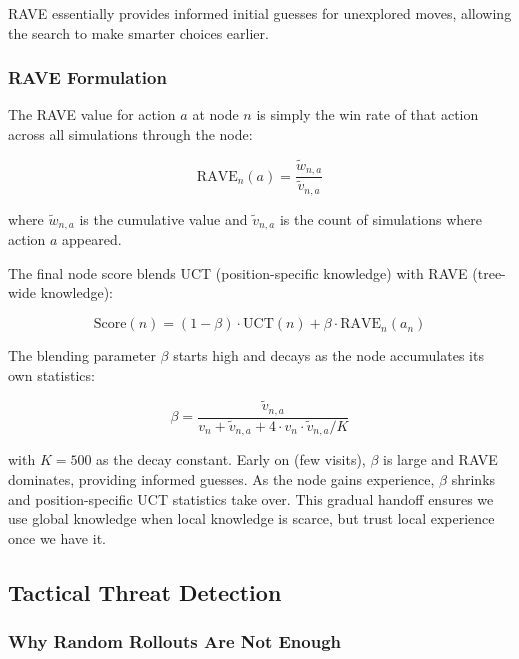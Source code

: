 \documentclass[11pt]{article}
\begin{document}
RAVE essentially provides informed initial guesses for unexplored moves, allowing the search to make smarter choices earlier.

\subsubsection{RAVE Formulation}

The RAVE value for action $a$ at node $n$ is simply the win rate of that action across all simulations through the node:

\begin{equation}
    \text{RAVE}_n(a) = \frac{\tilde{w}_{n,a}}{\tilde{v}_{n,a}}
\end{equation}

where $\tilde{w}_{n,a}$ is the cumulative value and $\tilde{v}_{n,a}$ is the count of simulations where action $a$ appeared.

The final node score blends UCT (position-specific knowledge) with RAVE (tree-wide knowledge):

\begin{equation}
    \text{Score}(n) = (1 - \beta) \cdot \text{UCT}(n) + \beta \cdot \text{RAVE}_n(a_n)
\end{equation}

The blending parameter $\beta$ starts high and decays as the node accumulates its own statistics:

\begin{equation}
    \beta = \frac{\tilde{v}_{n,a}}{v_n + \tilde{v}_{n,a} + 4 \cdot v_n \cdot \tilde{v}_{n,a} / K}
\end{equation}

with $K = 500$ as the decay constant. Early on (few visits), $\beta$ is large and RAVE dominates, providing informed guesses. As the node gains experience, $\beta$ shrinks and position-specific UCT statistics take over. This gradual handoff ensures we use global knowledge when local knowledge is scarce, but trust local experience once we have it.

\subsection{Tactical Threat Detection}
\label{sec:tactical}

\subsubsection{Why Random Rollouts Are Not Enough}
\end{document}
